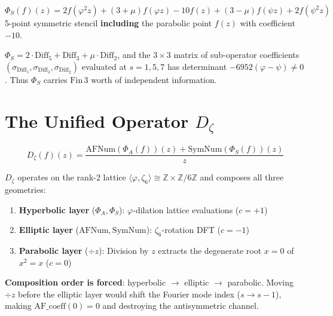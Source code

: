 \begin{definition}
\label{def:PhiS}
\leanok
\[
\Phi_S(f)(z) = 2f(\varphi^2 z) + (3+\mu)f(\varphi z) - 10f(z) + (3-\mu)f(\psi z) + 2f(\psi^2 z)
\]
5-point symmetric stencil \textbf{including} the parabolic point $f(z)$ with coefficient $-10$.
\end{definition}

\begin{theorem}
\label{thm:PhiS_rank_three}
\leanok
$\Phi_S = 2 \cdot \mathrm{Diff}_5 + \mathrm{Diff}_3 + \mu \cdot \mathrm{Diff}_2$, and the $3 \times 3$ matrix of sub-operator coefficients
$(\sigma_{\mathrm{Diff}_5}, \sigma_{\mathrm{Diff}_3}, \sigma_{\mathrm{Diff}_2})$ evaluated at $s = 1, 5, 7$ has determinant $-6952(\varphi - \psi) \neq 0$.
Thus $\Phi_S$ carries $\mathrm{Fin}\,3$ worth of independent information.
\end{theorem}

\section{The Unified Operator \texorpdfstring{$D_\zeta$}{Dζ}}
\label{sec:unified_Dzeta}

\begin{definition}
\label{def:Dzeta}
\leanok
\[
\boxed{D_\zeta(f)(z) = \frac{\mathrm{AFNum}(\Phi_A(f))(z) + \mathrm{SymNum}(\Phi_S(f))(z)}{z}}
\]
\end{definition}

$D_\zeta$ operates on the rank-2 lattice $\langle \varphi, \zeta_6 \rangle \cong \mathbb{Z} \times \mathbb{Z}/6\mathbb{Z}$ and composes all three geometries:

\begin{enumerate}
\item \textbf{Hyperbolic layer} ($\Phi_A, \Phi_S$): $\varphi$-dilation lattice evaluations ($c = +1$)
\item \textbf{Elliptic layer} ($\mathrm{AFNum}, \mathrm{SymNum}$): $\zeta_6$-rotation DFT ($c = -1$)
\item \textbf{Parabolic layer} ($\div z$): Division by $z$ extracts the degenerate root $x = 0$ of $x^2 = x$ ($c = 0$)
\end{enumerate}

\textbf{Composition order is forced}: hyperbolic $\to$ elliptic $\to$ parabolic. Moving $\div z$ before the elliptic layer would shift the Fourier mode index ($s \to s-1$), making $\mathrm{AF\_coeff}(0) = 0$ and destroying the antisymmetric channel.


